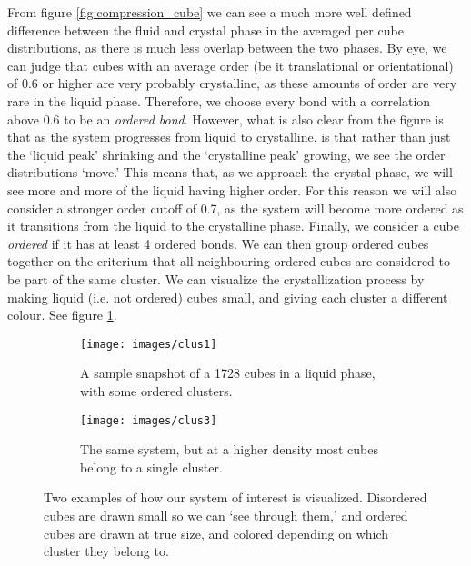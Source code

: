 \documentclass[thesis]{subfiles}
\begin{document}
From figure \ref{fig:compression_cube} we can see a much more well defined difference between the fluid and crystal phase in the averaged per cube distributions, as there is much less overlap between the two phases. By eye, we can judge that cubes with an average order (be it translational or orientational) of 0.6 or higher are very probably crystalline, as these amounts of order are very rare in the liquid phase. Therefore, we choose every bond with a correlation above 0.6 to be an \emph{ordered bond}. However, what is also clear from the figure is that as the system progresses from liquid to crystalline, is that rather than just the `liquid peak' shrinking and the `crystalline peak' growing, we see the order distributions `move.' This means that, as we approach the crystal phase, we will see more and more of the liquid having higher order. For this reason we will also consider a stronger order cutoff of 0.7, as the system will become more ordered as it transitions from the liquid to the crystalline phase.
Finally, we consider a cube \emph{ordered} if it has at least 4 ordered bonds. We can then group ordered cubes together on the criterium that all neighbouring ordered cubes are considered to be part of the same cluster. We can visualize the crystallization process by making liquid (i.e. not ordered) cubes small, and giving each cluster a different colour. See figure \ref{fig:sample_snapshot}.

\begin{figure}[H]
	\centering
	\begin{subfigure}{0.48\textwidth}
		\centering
		\texttt{[image: images/clus1]}
		\caption{A sample snapshot of a 1728 cubes in a liquid phase, with some ordered clusters.}
	\end{subfigure}\hfill
	\begin{subfigure}{0.48\textwidth}
		\centering
		\texttt{[image: images/clus3]}
		\caption{The same system, but at a higher density most cubes belong to a single cluster.}
	\end{subfigure}
	\caption{Two examples of how our system of interest is visualized. Disordered cubes are drawn small so we can `see through them,' and ordered cubes are drawn at true size, and colored depending on which cluster they belong to.}
	\label{fig:sample_snapshot}
\end{figure}

\end{document}
